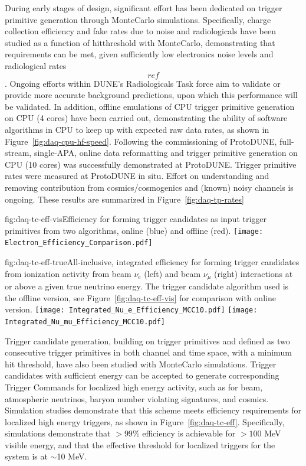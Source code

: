 During early stages of design, significant effort has been dedicated on trigger primitive generation
through MonteCarlo simulations. Specifically, charge collection efficiency and fake rates
due to noise and radiologicals have been studied as a function of
hitthreshold with MonteCarlo, demonstrating that requirements can be
met, given sufficiently low electronics noise levels and radiological
rates \[ref\]. Ongoing efforts within DUNE's Radiologicals Task force
aim to validate or provide more accurate background predictions, upon
which this performance will be validated. In addition, offline emulations
of CPU trigger primitive generation on CPU (4 cores) have been carried
out, demonstrating the ability of software algorithms in CPU to keep
up with expected raw data rates, as shown in Figure~\ref{fig:daq-cpu-hf-speed}. 
Following the commissioning of ProtoDUNE, full-stream, single-APA,
online data reformatting and trigger primitive generation on CPU (10 cores) was successfully
demonstrated at ProtoDUNE. Trigger primitive rates were measured at
ProtoDUNE in situ. Effort on understanding and removing contribution
from cosmics/cosmogenics and (known) noisy channels is ongoing.
These results are summarized in Figure~\ref{fig:daq-tp-rates}

\begin{dunefigure}{fig:daq-tc-eff-vis}{Efficiency for forming trigger candidates as input trigger primitives from two algorithms, online (blue) and offline (red).}
  \texttt{[image: Electron\_Efficiency\_Comparison.pdf]}
\end{dunefigure}

\begin{dunefigure}{fig:daq-tc-eff-true}{All-inclusive, integrated efficiency for forming trigger candidates from ionization activity from beam $\nu_e$ (left) and beam $\nu_\mu$ (right) interactions at or above a given true neutrino energy.  The trigger candidate algorithm used is the offline version, see Figure~\ref{fig:daq-tc-eff-vis} for comparison with online version.}
  \texttt{[image: Integrated\_Nu\_e\_Efficiency\_MCC10.pdf]}%
  \texttt{[image: Integrated\_Nu\_mu\_Efficiency\_MCC10.pdf]}
\end{dunefigure}


Trigger candidate generation, building on trigger primitives and defined
as two consecutive trigger primitives in both channel and time space,
with a minimum hit threshold, have also been studied with MonteCarlo
simulations. Trigger candidates with sufficient energy can be accepted
to generate corresponding Trigger Commands for localized high energy
activity, such as for beam, atmospheric neutrinos, baryon number
violating signatures, and cosmics. Simulation studies demonstrate that
this scheme meets efficiency requirements for localized high energy
triggers, as shown in Figure~\ref{fig:daq-tc-eff}. Specifically,
simulations demonstrate that $>99$\% efficiency is achievable for
$>100$ MeV visible energy, and that the effective threshold for
localized triggers for the system is at $\sim$10 MeV. 

